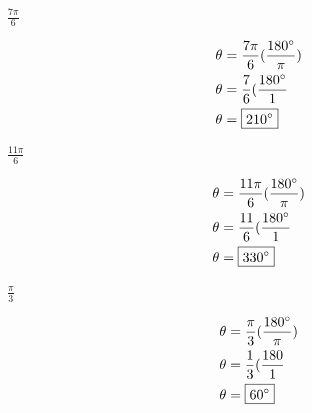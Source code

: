 \documentclass[10pt,letterpaper]{amspset}
\begin{document}
\begin{problem} [39.]
$\frac{7\pi}{6}$
\end{problem}

\begin{solution}
\begin{align}
    \theta &= \frac{7\pi}{6} (\frac{180\degree}{\pi}) \\
    \theta &= \frac{7}{6} (\frac{180\degree}{1} \\
    \theta &= \boxed{210\degree} \\
\end{align}
\end{solution}


\begin{problem} [40.]
$\frac{11\pi}{6}$
\end{problem}

\begin{solution}
\begin{align}
    \theta &= \frac{11\pi}{6} (\frac{180\degree}{\pi}) \\
    \theta &= \frac{11}{6} (\frac{180\degree}{1} \\
    \theta &= \boxed{330\degree} \\
\end{align}
\end{solution}


\begin{problem} [41.]
$\frac{\pi}{3}$
\end{problem}

\begin{solution}
\begin{align}
    \theta &= \frac{\pi}{3} (\frac{180\degree}{\pi}) \\
    \theta &= \frac{1}{3} (\frac{180}{1} \\
    \theta &= \boxed{60\degree} \\
\end{align}
\end{solution}
\end{document}
